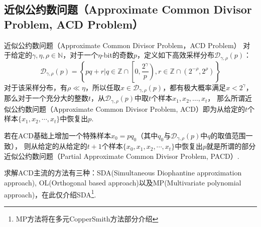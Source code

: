 \documentclass{book}
\numberwithin{equation}{subsubsection}
\begin{document}
\subsection{近似公约数问题（Approximate Common Divisor Problem, ACD Problem）\cite{20}}

\begin{concept}{近似公约数问题（Approximate Common Divisor Problem，ACD Problem）}
    对于给定的$\gamma,\eta,\rho\in\mathbb{N}$，对于一个$\eta$-bit的奇数$p$，定义如下高效采样分布$\mathcal{D}_{\gamma,\rho}(p)$：
    \begin{equation}
        \mathcal{D}_{\gamma,\rho}(p)=\left\{pq+r|q\in\mathbb{Z}\cap\left[0,\frac{2^{\gamma}}{p}\right),r\in\mathbb{Z}\cap\left(2^{-\rho},2^{\rho}\right)\right\}
        \nonumber
    \end{equation}
    对于该采样分布，有$\rho\ll\eta$，所以任取$x\in\mathcal{D}_{\gamma,\rho}(p)$，都有极大概率满足$x<2^{\gamma}$，那么对于一个充分大的整数$t$，从$\mathcal{D}_{\gamma,\rho}(p)$中取$t$个样本$x_1,x_2,\ldots,x_{t}$，
    那么所谓近似公约数问题（Approximate Common Divisor Problem, ACD）即为从给定的$t$个样本$\{x_1,x_2,\cdots,x_{t}\}$中恢复出$p$.
\end{concept}

若在ACD基础上增加一个特殊样本$x_0=pq_0$（其中$q_0$与$\mathcal{D}_{\gamma,\rho}(p)$中$q$的取值范围一致），
则从给定的从给定的$t+1$个样本$\{x_0,x_1,x_2,\cdots,x_{t}\}$中恢复出$p$就是所谓的部分近似公约数问题（Partial Approximate Common Divisor Problem, PACD）.\par
求解ACD主流的方法有三种：SDA(Simultaneous Diophantine approximation approach), OL(Orthogonal based approach)以及MP(Multivariate polynomial approach)，在此仅介绍SDA\footnote{MP方法将在多元CopperSmith方法部分介绍}.
\end{document}
